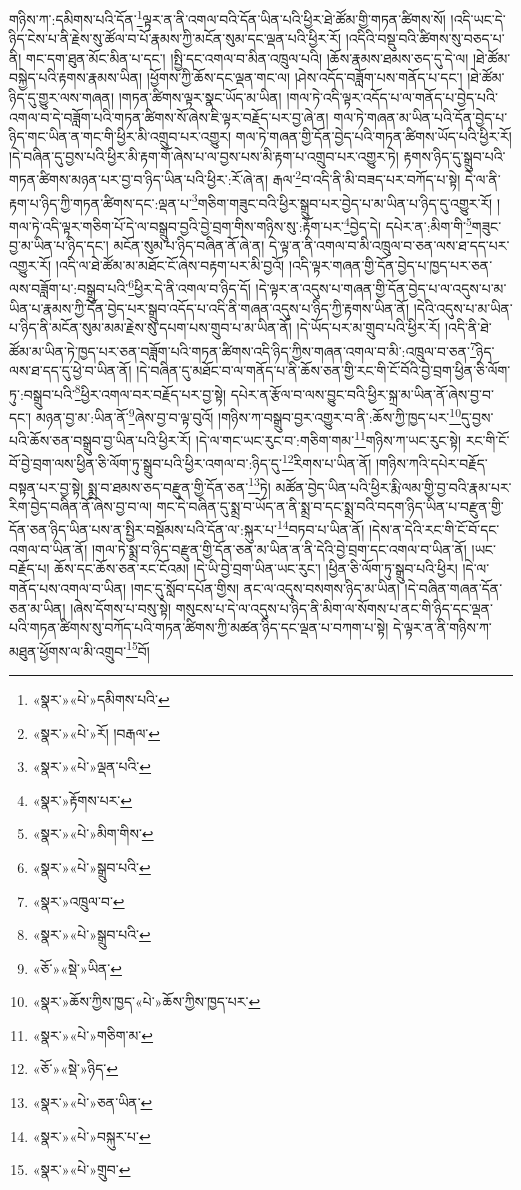 གཉིས་ཀ་:དམིགས་པའི་དོན་\footnote{«སྣར་»«པེ་»དམིགས་པའི་}ལྟར་ན་ནི་འགལ་བའི་དོན་ཡིན་པའི་ཕྱིར་ཐེ་ཚོམ་གྱི་གཏན་ཚིགས་སོ། །འདི་ཡང་དེ་ཉིད་ངེས་པ་ནི་རྗེས་སུ་ཚོལ་བ་པོ་རྣམས་ཀྱི་མངོན་སུམ་དང་ལྡན་པའི་ཕྱིར་རོ། །འདིའི་བསྡུ་བའི་ཚིགས་སུ་བཅད་པ་ནི། གང་དག་ཐུན་མོང་མིན་པ་དང་། །སྤྱི་དང་འགལ་བ་མིན་འཁྲུལ་པའི། །ཆོས་རྣམས་ཐམས་ཅད་དུ་དེ་ལ། །ཐེ་ཚོམ་བསྐྱེད་པའི་རྟགས་རྣམས་ཡིན། །ཕྱོགས་ཀྱི་ཆོས་དང་ལྡན་གང་ལ། །ཤེས་འདོད་བཟློག་པས་གནོད་པ་དང་། །ཐེ་ཚོམ་ཉིད་དུ་གྱུར་ལས་གཞན། །གཏན་ཚིགས་ལྟར་སྣང་ཡོད་མ་ཡིན། །གལ་ཏེ་འདི་ལྟར་འདོད་པ་ལ་གནོད་པ་བྱེད་པའི་འགལ་བ་དེ་བཟློག་པའི་གཏན་ཚིགས་སོ་ཞེས་ཇི་ལྟར་བརྗོད་པར་བྱ་ཞེ་ན། གལ་ཏེ་གཞན་མ་ཡིན་པའི་དོན་བྱེད་པ་ཉིད་གང་ཡིན་ན་གང་གི་ཕྱིར་མི་འགྲུབ་པར་འགྱུར། གལ་ཏེ་གཞན་གྱི་དོན་བྱེད་པའི་གཏན་ཚིགས་ཡོད་པའི་ཕྱིར་རོ། །དེ་བཞིན་དུ་བྱས་པའི་ཕྱིར་མི་རྟག་གོ་ཞེས་པ་ལ་བྱས་པས་མི་རྟག་པ་འགྲུབ་པར་འགྱུར་ཏེ། རྟགས་ཉིད་དུ་སྒྲུབ་པའི་གཏན་ཚིགས་མཉན་པར་བྱ་བ་ཉིད་ཡིན་པའི་ཕྱིར་:རོ་ཞེ་ན། རྒལ་\footnote{«སྣར་»«པེ་»རོ། །བརྒལ་}བ་འདི་ནི་མི་བཟད་པར་བཀོད་པ་སྟེ། དེ་ལ་ནི་རྟག་པ་ཉིད་ཀྱི་གཏན་ཚིགས་དང་:ལྡན་པ་\footnote{«སྣར་»«པེ་»ལྡན་པའི་}གཅིག་གཟུང་བའི་ཕྱིར་སྒྲུབ་པར་བྱེད་པ་མ་ཡིན་པ་ཉིད་དུ་འགྱུར་རོ། །གལ་ཏེ་འདི་ལྟར་གཅིག་པོ་དེ་ལ་བསྒྲུབ་བྱའི་བྱེ་བྲག་གིས་གཉིས་སུ་:རྟོག་པར་\footnote{«སྣར་»རྟོགས་པར་}བྱེད་དེ། དཔེར་ན་:མིག་གི་\footnote{«སྣར་»«པེ་»མིག་གིས་}གཟུང་བྱ་མ་ཡིན་པ་ཉིད་དང་། མངོན་སུམ་པ་ཉིད་བཞིན་ནོ་ཞེ་ན། དེ་ལྟ་ན་ནི་འགལ་བ་མི་འཁྲུལ་བ་ཅན་ལས་ཐ་དད་པར་འགྱུར་རོ། །འདི་ལ་ཐེ་ཚོམ་མ་མཐོང་ངོ་ཞེས་བརྟག་པར་མི་བྱའོ། །འདི་ལྟར་གཞན་གྱི་དོན་བྱེད་པ་ཁྱད་པར་ཅན་ལས་བཟློག་པ་:བསྒྲུབ་པའི་\footnote{«སྣར་»«པེ་»སྒྲུབ་པའི་}ཕྱིར་དེ་ནི་འགལ་བ་ཉིད་དོ། །དེ་ལྟར་ན་འདུས་པ་གཞན་གྱི་དོན་བྱེད་པ་ལ་འདུས་པ་མ་ཡིན་པ་རྣམས་ཀྱི་དོན་བྱེད་པར་སྒྲུབ་འདོད་པ་འདི་ནི་གཞན་འདུས་པ་ཉིད་ཀྱི་རྟགས་ཡིན་ནོ། །དེའི་འདུས་པ་མ་ཡིན་པ་ཉིད་ནི་མངོན་སུམ་མམ་རྗེས་སུ་དཔག་པས་གྲུབ་པ་མ་ཡིན་ནོ། །དེ་ཡོད་པར་མ་གྲུབ་པའི་ཕྱིར་རོ། །འདི་ནི་ཐེ་ཚོམ་མ་ཡིན་ཏེ་ཁྱད་པར་ཅན་བཟློག་པའི་གཏན་ཚིགས་འདི་ཉིད་ཀྱིས་གཞན་འགལ་བ་མི་:འཁྲུལ་བ་ཅན་\footnote{«སྣར་»འཁྲུལ་བ་}ཉིད་ལས་ཐ་དད་དུ་ཕྱེ་བ་ཡིན་ནོ། །དེ་བཞིན་དུ་མཐོང་བ་ལ་གནོད་པ་ནི་ཆོས་ཅན་གྱི་རང་གི་ངོ་བོའི་བྱེ་བྲག་ཕྱིན་ཅི་ལོག་ཏུ་:བསྒྲུབ་པའི་\footnote{«སྣར་»«པེ་»སྒྲུབ་པའི་}ཕྱིར་འགལ་བར་བརྗོད་པར་བྱ་སྟེ། དཔེར་ན་རྩོལ་བ་ལས་བྱུང་བའི་ཕྱིར་སྐྲ་མ་ཡིན་ནོ་ཞེས་བྱ་བ་དང་། མཉན་བྱ་མ་:ཡིན་ནོ་\footnote{«ཅོ་»«སྡེ་»ཡིན་}ཞེས་བྱ་བ་ལྟ་བུའོ། །གཉིས་ཀ་བསྒྲུབ་བྱར་འགྱུར་བ་ནི་:ཆོས་ཀྱི་ཁྱད་པར་\footnote{«སྣར་»ཆོས་ཀྱིས་ཁྱད་«པེ་»ཆོས་ཀྱིས་ཁྱད་པར་}དུ་བྱས་པའི་ཆོས་ཅན་བསྒྲུབ་བྱ་ཡིན་པའི་ཕྱིར་རོ། །དེ་ལ་གང་ཡང་རུང་བ་:གཅིག་གམ་\footnote{«སྣར་»«པེ་»གཅིག་མ་}གཉིས་ཀ་ཡང་རུང་སྟེ། རང་གི་ངོ་བོ་བྱེ་བྲག་ལས་ཕྱིན་ཅི་ལོག་ཏུ་སྒྲུབ་པའི་ཕྱིར་འགལ་བ་:ཉིད་དུ་\footnote{«ཅོ་»«སྡེ་»ཉིད་}རིགས་པ་ཡིན་ནོ། །གཉིས་ཀའི་དཔེར་བརྗོད་བསྟན་པར་བྱ་སྟེ། སྨྲ་བ་ཐམས་ཅད་བརྫུན་གྱི་དོན་ཅན་\footnote{«སྣར་»«པེ་»ཅན་ཡིན་}ཏེ། མཚོན་བྱེད་ཡིན་པའི་ཕྱིར་རྨི་ལམ་གྱི་བྱ་བའི་རྣམ་པར་རིག་བྱེད་བཞིན་ནོ་ཞེས་བྱ་བ་ལ། གང་དེ་བཞིན་དུ་སྨྲ་བ་ཡོད་ན་ནི་སྨྲ་བ་དང་སྨྲ་བའི་བདག་ཉིད་ཡིན་པ་བརྫུན་གྱི་དོན་ཅན་ཉིད་ཡིན་པས་ན་སྤྱིར་བསྡོམས་པའི་དོན་ལ་:སྐུར་པ་\footnote{«སྣར་»«པེ་»བསྐུར་པ་}བཏབ་པ་ཡིན་ནོ། །དེས་ན་དེའི་རང་གི་ངོ་བོ་དང་འགལ་བ་ཡིན་ནོ། །གལ་ཏེ་སྨྲ་བ་ཉིད་བརྫུན་གྱི་དོན་ཅན་མ་ཡིན་ན་ནི་དེའི་བྱེ་བྲག་དང་འགལ་བ་ཡིན་ནོ། །ཡང་བརྗོད་པ། ཆོས་དང་ཆོས་ཅན་རང་ངོའམ། །དེ་ཡི་བྱེ་བྲག་ཡིན་ཡང་རུང་། །ཕྱིན་ཅི་ལོག་ཏུ་སྒྲུབ་པའི་ཕྱིར། །དེ་ལ་གནོད་པས་འགལ་བ་ཡིན། །གང་དུ་སློབ་དཔོན་གྱིས། ནང་ལ་འདུས་བསགས་ཉིད་མ་ཡིན། །དེ་བཞིན་གཞན་དོན་ཅན་མ་ཡིན། །ཞེས་དོགས་པ་བསུ་སྟེ། གསུངས་པ་དེ་ལ་འདུས་པ་ཉིད་ནི་མིག་ལ་སོགས་པ་ནང་གི་ཉིད་དང་ལྡན་པའི་གཏན་ཚིགས་སུ་བཀོད་པའི་གཏན་ཚིགས་ཀྱི་མཚན་ཉིད་དང་ལྡན་པ་བཀག་པ་སྟེ། དེ་ལྟར་ན་ནི་གཉིས་ཀ་མཐུན་ཕྱོགས་ལ་མི་འགྲུབ་\footnote{«སྣར་»«པེ་»གྲུབ་}བོ། 